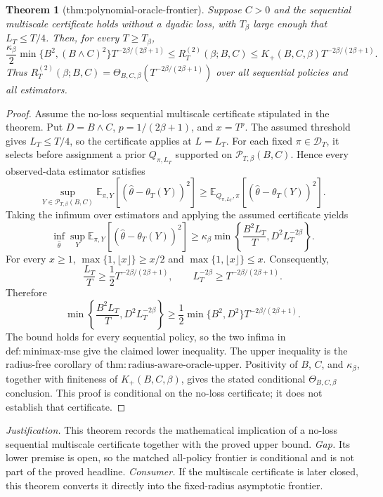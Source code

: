 \documentclass{article}
\newtheorem{theorem}{Theorem}
\begin{document}
\begin{theorem}[thm:polynomial-oracle-frontier]\label{thm:polynomial-oracle-frontier}
Suppose \(C>0\) and the sequential multiscale certificate holds without a dyadic loss, with \(T_\beta\) large enough that \(L_T\le T/4\). Then, for every \(T\ge T_\beta\), \[\frac{\kappa_\beta}{2}\min\{B^2,(B\wedge C)^2\}T^{-2\beta/(2\beta+1)}\le R_T^{(2)}(\beta;B,C)\le K_+(B,C,\beta)T^{-2\beta/(2\beta+1)}.\] Thus \(R_T^{(2)}(\beta;B,C)=\Theta_{B,C,\beta}(T^{-2\beta/(2\beta+1)})\) over all sequential policies and all estimators.
\end{theorem}
\begin{proof}
Assume the no-loss sequential multiscale certificate stipulated in the theorem.  Put \(D=B\wedge C\), \(p=1/(2\beta+1)\), and \(x=T^p\).  The assumed threshold gives \(L_T\le T/4\), so the certificate applies at \(L=L_T\).  For each fixed \(\pi\in\mathcal D_T\), it selects before assignment a prior \(Q_{\pi,L_T}\) supported on \(\mathcal P_{T,\beta}(B,C)\).  Hence every observed-data estimator satisfies
\[
 \sup_{Y\in\mathcal P_{T,\beta}(B,C)}
 \mathbb E_{\pi,Y}\!\left[(\widehat\theta-\theta_T(Y))^2\right]
 \ge
 \mathbb E_{Q_{\pi,L_T},\pi}\!\left[(\widehat\theta-\theta_T(Y))^2\right].
\]
Taking the infimum over estimators and applying the assumed certificate yields
\[
 \inf_{\widehat\theta}\sup_Y
 \mathbb E_{\pi,Y}\!\left[(\widehat\theta-\theta_T(Y))^2\right]
 \ge
 \kappa_\beta\min\left\{\frac{B^2L_T}{T},D^2L_T^{-2\beta}\right\}.
\]
For every \(x\ge1\), \(\max\{1,\lfloor x\rfloor\}\ge x/2\) and \(\max\{1,\lfloor x\rfloor\}\le x\).  Consequently,
\[
 \frac{L_T}{T}\ge\frac12T^{-2\beta/(2\beta+1)},
 \qquad
 L_T^{-2\beta}\ge T^{-2\beta/(2\beta+1)}.
\]
Therefore
\[
 \min\left\{\frac{B^2L_T}{T},D^2L_T^{-2\beta}\right\}
 \ge\frac12\min\{B^2,D^2\}T^{-2\beta/(2\beta+1)}.
\]
The bound holds for every sequential policy, so the two infima in \(\mathrm{def{:}minimax\mbox{-}mse}\) give the claimed lower inequality.  The upper inequality is the radius-free corollary of \(\mathrm{thm{:}radius\mbox{-}aware\mbox{-}oracle\mbox{-}upper}\).  Positivity of \(B\), \(C\), and \(\kappa_\beta\), together with finiteness of \(K_+(B,C,\beta)\), gives the stated conditional \(\Theta_{B,C,\beta}\) conclusion.  This proof is conditional on the no-loss certificate; it does not establish that certificate.
\end{proof}
\par\smallskip\noindent \textit{Justification.} This theorem records the mathematical implication of a no-loss sequential multiscale certificate together with the proved upper bound. \textit{Gap.} Its lower premise is open, so the matched all-policy frontier is conditional and is not part of the proved headline. \textit{Consumer.} If the multiscale certificate is later closed, this theorem converts it directly into the fixed-radius asymptotic frontier.
\end{document}
